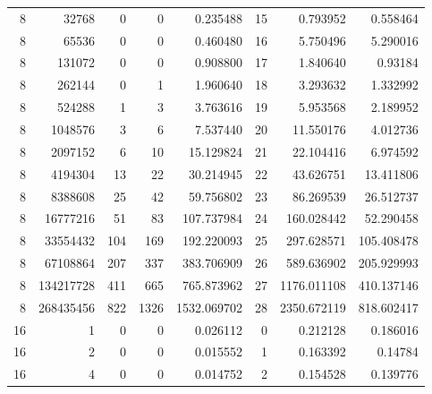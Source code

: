 \begin{longtable}[c]{@{}rrrrrrrr@{}}
    8         & 32768     & 0         & 0        & 0.235488    & 15                  & 0.793952    & 0.558464   \\
    8         & 65536     & 0         & 0        & 0.460480    & 16                  & 5.750496    & 5.290016   \\
    8         & 131072    & 0         & 0        & 0.908800    & 17                  & 1.840640    & 0.93184    \\
    8         & 262144    & 0         & 1        & 1.960640    & 18                  & 3.293632    & 1.332992   \\
    8         & 524288    & 1         & 3        & 3.763616    & 19                  & 5.953568    & 2.189952   \\
    8         & 1048576   & 3         & 6        & 7.537440    & 20                  & 11.550176   & 4.012736   \\
    8         & 2097152   & 6         & 10       & 15.129824   & 21                  & 22.104416   & 6.974592   \\
    8         & 4194304   & 13        & 22       & 30.214945   & 22                  & 43.626751   & 13.411806  \\
    8         & 8388608   & 25        & 42       & 59.756802   & 23                  & 86.269539   & 26.512737  \\
    8         & 16777216  & 51        & 83       & 107.737984  & 24                  & 160.028442  & 52.290458  \\
    8         & 33554432  & 104       & 169      & 192.220093  & 25                  & 297.628571  & 105.408478 \\
    8         & 67108864  & 207       & 337      & 383.706909  & 26                  & 589.636902  & 205.929993 \\
    8         & 134217728 & 411       & 665      & 765.873962  & 27                  & 1176.011108 & 410.137146 \\
    8         & 268435456 & 822       & 1326     & 1532.069702 & 28                  & 2350.672119 & 818.602417 \\
    16        & 1         & 0         & 0        & 0.026112    & 0                   & 0.212128    & 0.186016   \\
    16        & 2         & 0         & 0        & 0.015552    & 1                   & 0.163392    & 0.14784    \\
    16        & 4         & 0         & 0        & 0.014752    & 2                   & 0.154528    & 0.139776   \\

\end{longtable}
